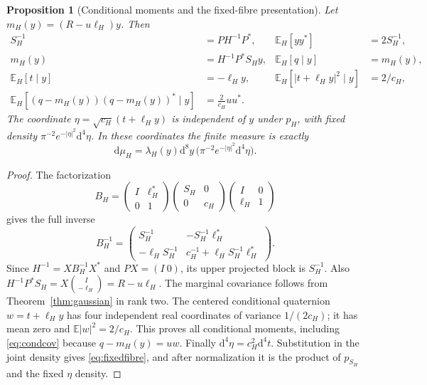 \documentclass[11pt,a4paper]{article}
\numberwithin{equation}{section}
\newtheorem{proposition}[theorem]{Proposition}
\theoremstyle{definition}
\theoremstyle{remark}
\newcommand{\EE}{\mathbb E}
\begin{document}
\begin{proposition}[Conditional moments and the fixed-fibre presentation]\label{prop:conditionalmom}
Let $m_H(y)=(R-u\ell_H)y$. Then
\begin{align}
S_H^{-1}&=PH^{-1}P^*, &
\EE_H[yy^*]&=2S_H^{-1},\label{eq:marginalcov}\\
m_H(y)&=H^{-1}P^*S_Hy, &
\EE_H[q\mid y]&=m_H(y),\label{eq:condmean}\\
\EE_H[t\mid y]&=-\ell_Hy,&
\EE_H[|t+\ell_Hy|^2\mid y]&=2/c_H,\label{eq:tmom}\\
\EE_H[(q-m_H(y))(q-m_H(y))^*\mid y]&=\frac2{c_H}uu^*.
\label{eq:condcov}
\end{align}
The coordinate $\eta=\sqrt{c_H}(t+\ell_Hy)$ is independent of $y$
under $p_H$, with fixed density $\pi^{-2}e^{-|\eta|^2}\mathrm d^4\eta$.
In these coordinates the finite measure is exactly
\begin{equation}\label{eq:fixedfibre}
\mathrm d\mu_H
=\lambda_H(y)\mathrm d^8y\,
 \bigl(\pi^{-2}e^{-|\eta|^2}\mathrm d^4\eta\bigr).
\end{equation}
\end{proposition}
\begin{proof}
The factorization
\[
B_H=\begin{pmatrix}I&\ell_H^*\\0&1\end{pmatrix}
\begin{pmatrix}S_H&0\\0&c_H\end{pmatrix}
\begin{pmatrix}I&0\\\ell_H&1\end{pmatrix}
\]
gives the full inverse
\[
B_H^{-1}=\begin{pmatrix}
S_H^{-1}&-S_H^{-1}\ell_H^*\\
-\ell_HS_H^{-1}&c_H^{-1}+\ell_HS_H^{-1}\ell_H^*
\end{pmatrix}.
\]
Since $H^{-1}=XB_H^{-1}X^*$ and $PX=(I\ 0)$, its upper projected
block is $S_H^{-1}$. Also
$H^{-1}P^*S_H=X\binom I{-\ell_H}=R-u\ell_H$.
The marginal covariance follows from Theorem~\ref{thm:gaussian} in
rank two. The centered conditional quaternion $w=t+\ell_Hy$ has
four independent real coordinates of variance $1/(2c_H)$; it has mean
zero and $\EE|w|^2=2/c_H$. This proves all conditional moments,
including \eqref{eq:condcov} because $q-m_H(y)=uw$.
Finally $\mathrm d^4\eta=c_H^2\mathrm d^4t$. Substitution in
the joint density gives \eqref{eq:fixedfibre}, and after normalization
it is the product of $p_{S_H}$ and the fixed $\eta$ density.
\end{proof}
\end{document}

